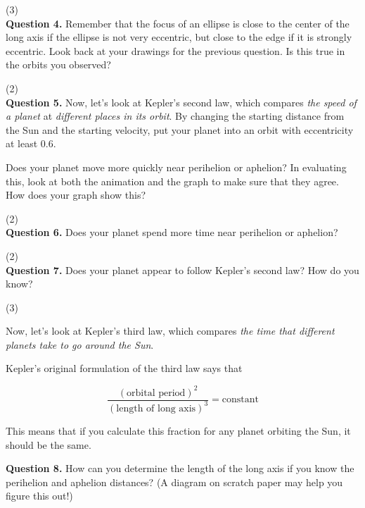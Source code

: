 \documentclass[11pt]{article}
\begin{document}
\vspace{1.5cm}
(3) \hrulefill\\

\textbf {Question 4.} Remember that the focus of an ellipse is close to the center of the long axis if the ellipse is not very eccentric, but close to the edge if it is strongly eccentric. Look back at your drawings for the previous question. Is this true in the orbits you observed?

\vspace{1.5cm}
(2) \hrulefill\\

\textbf {Question 5.} Now, let's look at Kepler's second law, which compares {\it the speed of a planet} at {\it different places in its orbit}. By changing the starting distance from the Sun and the starting velocity, put your planet into an orbit with eccentricity at least 0.6.

Does your planet move more quickly near perihelion or aphelion? In evaluating this, look at both the animation and the graph to make sure that they agree. How does your graph show this?

\vspace{1.5cm}
(2) \hrulefill\\

\textbf {Question 6.} Does your planet spend more time near perihelion or aphelion?

\vspace{1.5cm}
(2) \hrulefill\\


\textbf {Question 7.} Does your planet appear to follow Kepler's second law? How do you know?

\vspace{1.5cm}
(3) \hrulefill\\


\newpage

Now, let's look at Kepler's third law, which compares {\it the time that different planets take to go around the Sun}.

Kepler's original formulation of the third law says that

$$
\frac{(\mbox{orbital period})^2}{(\mbox{length of long axis})^3} = \mbox{constant}
$$

This means that if you calculate this fraction for any planet orbiting the Sun, it should be the same.

\textbf {Question 8.} How can you determine the length of the long axis if you know the perihelion and aphelion distances? (A diagram on scratch paper may help you figure this out!)
\end{document}

